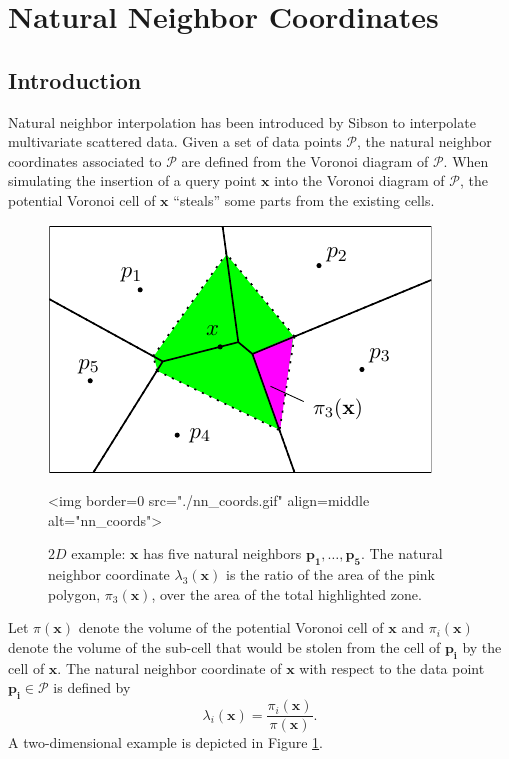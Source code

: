 \section{Natural Neighbor Coordinates\label{sec:coordinates}}
\subsection{Introduction}
Natural neighbor interpolation has been introduced by Sibson
\cite{s-bdnni-81} to interpolate multivariate scattered data.  Given
a set of data points $\mathcal{P}$, the natural neighbor coordinates
associated to $\mathcal{P}$ are defined from the Voronoi diagram of
$\mathcal{P}$.  When simulating the insertion of a query point
$\mathbf{x}$ into the Voronoi diagram of $\mathcal{P}$, the potential
Voronoi cell of $\mathbf{x}$ ``steals'' some parts from the existing
cells. 

\begin{figure}[ht!]
\begin{ccTexOnly}
\begin{center}
  \includegraphics{Interpolation/nn_coords}
\end{center}
\end{ccTexOnly}

\begin{ccHtmlOnly}
<img border=0 src="./nn_coords.gif"  align=middle  alt="nn_coords">
\end{ccHtmlOnly}

\caption{$2D$ example: $\mathbf{x}$ has five natural neighbors 
  $\mathbf{p_1},\ldots , \mathbf{p_5}$. 
  The natural neighbor coordinate $\lambda_3(\mathbf{x})$ is the ratio
  of the area of the pink polygon, $\pi_3(\mathbf{x})$, over the area
  of the total highlighted zone.
  \label{fig:nn_coords}}
\end{figure}



Let $\pi(\mathbf{x})$ denote the volume of the potential Voronoi cell
of $\mathbf{x}$ and $\pi_i(\mathbf{x})$ denote the volume of the
sub-cell that would be stolen from the cell of $\mathbf{p_i}$ by the
cell of $\mathbf{x}$.  The natural neighbor coordinate of $\mathbf{x}$
with respect to the data point $\mathbf{p_i}\in \mathcal{P}$ is defined by
$$
\lambda_i(\mathbf{x}) =
\frac{\pi_i(\mathbf{x})}{\pi(\mathbf{x})}.$$
A two-dimensional example
is depicted in Figure \ref{fig:nn_coords}.


